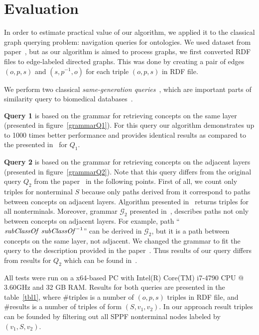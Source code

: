 \section{Evaluation}

In order to estimate practical value of our algorithm, we applied it to the classical graph querying problem: navigation queries for ontologies. 
We used dataset from paper~\cite{CFGonRDF}, but as our algorithm is aimed to process graphs, we first converted RDF files to edge-labeled directed graphs.
This was done by creating a pair of edges $(o,p,s)$ and $(s,p^{-1},o)$ for each triple $(o,p,s)$ in RDF file.

We perform two classical \textit{same-generation queries}~\cite{FndDB}, which are important parts of similarity query to biomedical databases~\cite{GraphQueryWithEarley}.

\textbf{Query 1} is based on the grammar for retrieving concepts on the same layer (presented in figure~\ref{grammarQ1}).
For this query our algorithm demonstrates up to 1000 times better performance and provides identical results as compared to the presented in~\cite{CFGonRDF} for $Q_1$. 

\textbf{Query 2} is based on the grammar for retrieving concepts on the adjacent layers (presented in figure~\ref{grammarQ2}). 
Note that this query differs from the original query $Q_2$ from the paper~\cite{CFGonRDF} in the following points.
First of all, we count only triples for nonterminal $S$ because only paths derived from it correspond to paths between concepts on adjacent layers.
Algorithm presented in~\cite{CFGonRDF} returns triples for all nonterminals.
Moreover, grammar $\mathcal{G}_2$ presented in~\cite{CFGonRDF}, describes paths not only between concepts on adjacent layers.
For example, path ``$\text{\textit{subClassOf} \textit{subClassOf}}^{-1}$'' can be derived in $\mathcal{G}_2$, but it is a path between concepts on the same layer, not adjacent.
We changed the grammar to fit the query to the description provided in the paper~\cite{CFGonRDF}. 
Thus results of our query differs from results for $Q_2$ which can be found in~\cite{CFGonRDF}.

All tests were run on a x64-based PC with Intel(R) Core(TM) i7-4790 CPU @ 3.60GHz and 32 GB RAM. 
Results for both queries are presented in the table~\ref{tbl1}, where \#triples is a number of $(o,p,s)$ triples in RDF file, and \#results is a number of triples of form $(S,v_1,v_2)$.
In our approach result triples can be founded by filtering out all SPPF nonterminal nodes labeled by $(v_1,S,v_2)$.

